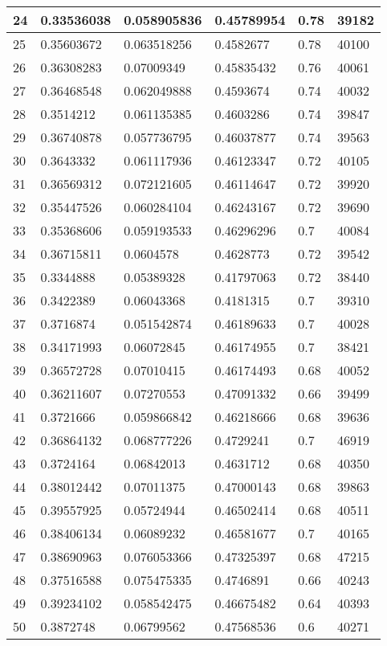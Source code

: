 \begin{longtable}{|l|l|l|l|l|l|}
24 & 0.33536038 & 0.058905836 & 0.45789954 & 0.78 & 39182 \\ \hline 
25 & 0.35603672 & 0.063518256 & 0.4582677 & 0.78 & 40100 \\ \hline 
26 & 0.36308283 & 0.07009349 & 0.45835432 & 0.76 & 40061 \\ \hline 
27 & 0.36468548 & 0.062049888 & 0.4593674 & 0.74 & 40032 \\ \hline 
28 & 0.3514212 & 0.061135385 & 0.4603286 & 0.74 & 39847 \\ \hline 
29 & 0.36740878 & 0.057736795 & 0.46037877 & 0.74 & 39563 \\ \hline 
30 & 0.3643332 & 0.061117936 & 0.46123347 & 0.72 & 40105 \\ \hline 
31 & 0.36569312 & 0.072121605 & 0.46114647 & 0.72 & 39920 \\ \hline 
32 & 0.35447526 & 0.060284104 & 0.46243167 & 0.72 & 39690 \\ \hline 
33 & 0.35368606 & 0.059193533 & 0.46296296 & 0.7 & 40084 \\ \hline 
34 & 0.36715811 & 0.0604578 & 0.4628773 & 0.72 & 39542 \\ \hline 
35 & 0.3344888 & 0.05389328 & 0.41797063 & 0.72 & 38440 \\ \hline 
36 & 0.3422389 & 0.06043368 & 0.4181315 & 0.7 & 39310 \\ \hline 
37 & 0.3716874 & 0.051542874 & 0.46189633 & 0.7 & 40028 \\ \hline 
38 & 0.34171993 & 0.06072845 & 0.46174955 & 0.7 & 38421 \\ \hline 
39 & 0.36572728 & 0.07010415 & 0.46174493 & 0.68 & 40052 \\ \hline 
40 & 0.36211607 & 0.07270553 & 0.47091332 & 0.66 & 39499 \\ \hline 
41 & 0.3721666 & 0.059866842 & 0.46218666 & 0.68 & 39636 \\ \hline 
42 & 0.36864132 & 0.068777226 & 0.4729241 & 0.7 & 46919 \\ \hline 
43 & 0.3724164 & 0.06842013 & 0.4631712 & 0.68 & 40350 \\ \hline 
44 & 0.38012442 & 0.07011375 & 0.47000143 & 0.68 & 39863 \\ \hline 
45 & 0.39557925 & 0.05724944 & 0.46502414 & 0.68 & 40511 \\ \hline 
46 & 0.38406134 & 0.06089232 & 0.46581677 & 0.7 & 40165 \\ \hline 
47 & 0.38690963 & 0.076053366 & 0.47325397 & 0.68 & 47215 \\ \hline 
48 & 0.37516588 & 0.075475335 & 0.4746891 & 0.66 & 40243 \\ \hline 
49 & 0.39234102 & 0.058542475 & 0.46675482 & 0.64 & 40393 \\ \hline 
50 & 0.3872748 & 0.06799562 & 0.47568536 & 0.6 & 40271 \\ \hline 
\end{longtable}